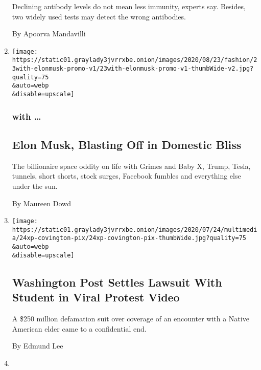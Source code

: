 \begin{enumerate}
  Declining antibody levels do not mean less immunity, experts say.
  Besides, two widely used tests may detect the wrong antibodies.

  By Apoorva Mandavilli
\item
  \href{/2020/07/25/style/elon-musk-maureen-dowd.html}{}

  \texttt{[image: https://static01.graylady3jvrrxbe.onion/images/2020/08/23/fashion/23with-elonmusk-promo-v1/23with-elonmusk-promo-v1-thumbWide-v2.jpg?quality=75\\\&auto=webp\\\&disable=upscale]}

  \hypertarget{with-}{%
  \subsubsection{with \ldots{}}\label{with-}}

  \hypertarget{elon-musk-blasting-off-in-domestic-bliss}{%
  \subsection{Elon Musk, Blasting Off in Domestic
  Bliss}\label{elon-musk-blasting-off-in-domestic-bliss}}

  The billionaire space oddity on life with Grimes and Baby X, Trump,
  Tesla, tunnels, short shorts, stock surges, Facebook fumbles and
  everything else under the sun.

  By Maureen Dowd
\item
  \href{/2020/07/24/business/media/washington-post-lawsuit-covington-student.html}{}

  \texttt{[image: https://static01.graylady3jvrrxbe.onion/images/2020/07/24/multimedia/24xp-covington-pix/24xp-covington-pix-thumbWide.jpg?quality=75\\\&auto=webp\\\&disable=upscale]}

  \hypertarget{washington-post-settles-lawsuit-with-student-in-viral-protest-video}{%
  \subsection{Washington Post Settles Lawsuit With Student in Viral
  Protest
  Video}\label{washington-post-settles-lawsuit-with-student-in-viral-protest-video}}

  A \$250 million defamation suit over coverage of an encounter with a
  Native American elder came to a confidential end.

  By Edmund Lee
\item
  \href{/2020/07/24/health/cdc-schools-coronavirus.html}{}


\end{enumerate}
